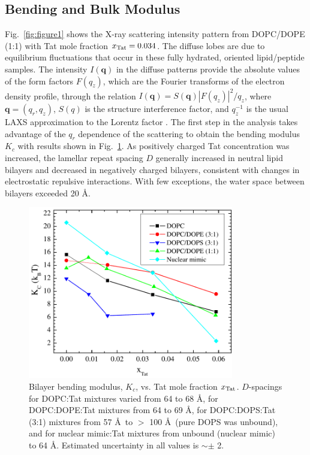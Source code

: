 \subsection{Bending and Bulk Modulus}\label{sec:Kc_results}
Fig.~\ref{fig:figure1} shows the X-ray scattering intensity pattern from 
DOPC/DOPE (1:1) with Tat mole fraction $x_\textrm{Tat}=0.034$. The diffuse lobes are 
due to equilibrium fluctuations that occur in these fully hydrated, oriented 
lipid/peptide samples. The intensity $I(\mathbf{q})$ in the diffuse 
patterns provide the absolute values of the form factors $F(q_z)$, which are 
the Fourier transforms of the electron density 
profile, through the relation $I(\mathbf{q})=S(\mathbf{q})|F(q_z)|^2/q_z$, 
where $\mathbf{q}=(q_r,q_z)$, $S(q)$ is 
the structure
interference factor, and $q_z^{-1}$ is the usual LAXS approximation to the 
Lorentz factor \cite{Kucerka05_BPJ,Kucerka06,Kucerka05_JMB}.
The first step in the analysis takes advantage of the $q_r$ dependence of the 
scattering to obtain the
bending modulus $K_c$ with results shown in Fig.~\ref{fig:figure2}. 
As positively charged Tat concentration was increased, 
the lamellar repeat spacing $D$ generally increased in neutral lipid 
bilayers and decreased in negatively charged bilayers, consistent with changes in 
electrostatic repulsive interactions. 
With few exceptions, the water space between bilayers exceeded 20 \AA.

\begin{figure}[htbp]
  \centering
  \includegraphics[width=0.8\textwidth]{figures/Tat/NFIT_results/Kc}
  \caption[Bilayer bending modulus, $K_c$, vs. Tat mole fraction $\xTat$]
  {Bilayer bending modulus, $K_c$, vs. Tat mole fraction $\xTat$. 
  $D$-spacings for DOPC:Tat mixtures varied from 64 to 68 \AA, 
  for DOPC:DOPE:Tat mixtures from 64 to 69 \AA, 
  for DOPC:DOPS:Tat (3:1) mixtures from 57 \AA\ to $>$ 100 \AA\ (pure DOPS was unbound), 
  and for nuclear mimic:Tat mixtures from unbound (nuclear mimic) to 64 \AA. 
  Estimated uncertainty in all values is  $\sim\pm$ 2.}
  \label{fig:figure2}
\end{figure}

